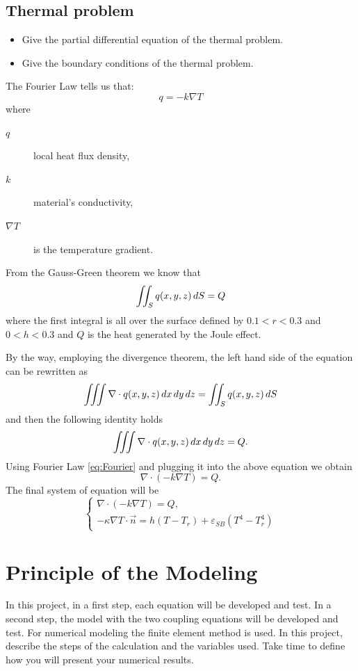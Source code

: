 \subsection{Thermal problem}
\begin{itemize}
	\item Give the partial differential equation of the thermal problem.
	\item Give the boundary conditions of the thermal problem.
\end{itemize}
\begin{mdframed}
	The Fourier Law tells us that:
	\begin{equation}
	\label{eq:Fourier}
	q=-k\nabla T
	\end{equation}
	where
	\begin{description}
		\item[$ q$] local heat flux density,
		\item[$ k $] material's conductivity,
		\item[$ \nabla T $] is the temperature gradient. 
	\end{description}
	From the Gauss-Green theorem we know that 
	\[
	\iint_S q(x,y,z) \mathop{}\!d S=Q
	\]
	where the first integral is all over the surface defined by $ 0.1<r<0.3 $ and $ 0<h<0.3 $ and $ Q $ is the heat generated by the Joule effect.
	
	By the way, employing the divergence theorem, the left hand side of the equation can be rewritten as  
	\[ \iiint \nabla\cdot q(x,y,z) \mathop{}\!d x\mathop{}\!d y\mathop{}\!d z = \iint_S q(x,y,z) \mathop{}\!d S  \]
	and then the following identity holds
	\begin{equation}
	\iiint \nabla\cdot q(x,y,z) \mathop{}\!d x\mathop{}\!d y\mathop{}\!d z = Q.
	\end{equation}
	Using Fourier Law \eqref{eq:Fourier} and plugging it into the above equation we obtain
	\begin{equation}
	\nabla\cdot(-k\nabla T)=Q.
	\end{equation}
	The final system of equation will be
	\begin{equation}
	\label{problem:heat}
	\begin{cases}
		\nabla\cdot(-k\nabla T)=Q, \\
		-\kappa\nabla T\cdot \vec{n}=h(T-T_r)+\varepsilon_{SB}(T^4-T_r^4)
	\end{cases}
	\end{equation}
\end{mdframed}

	
\section{Principle of the Modeling}
In this project, in a first step, each equation will be developed and test. In a second step, the model with the
two coupling equations will be developed and test. For numerical modeling the finite element method is
used. In this project, describe the steps of the calculation and the variables used. Take time to define how you
will present your numerical results.
